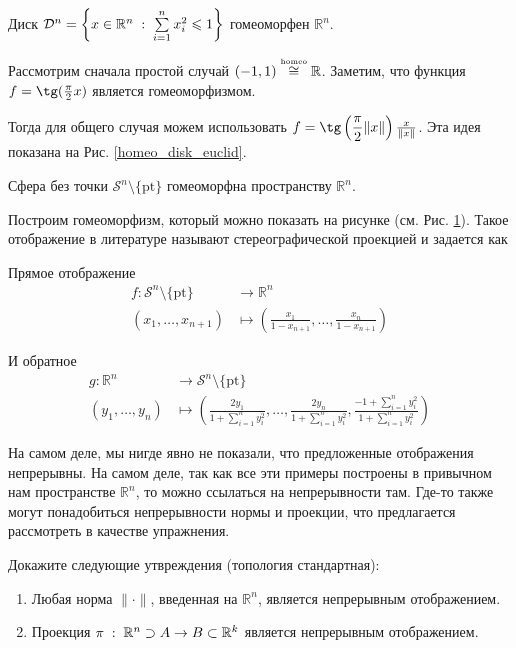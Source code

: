\begin{Ex}
    Диск $\mathcal{D}^{n} = \left\{x\in \mathbb{R}^{n} \; : \; \sum\limits_{i=1}^{n} x_i^2 \leqslant  1\right\}$ гомеоморфен $\mathbb{R}^n$.

    Рассмотрим сначала простой случай $(-1,1) \overset{\text{\tiny homeo}}{\cong} \mathbb{R}$. Заметим, что функция $f = \tg(\frac{\pi}{2}x)$ является гомеоморфизмом. 

    Тогда для общего случая можем использовать $f = \tg\left(\dfrac{\pi}{2} \|x\| \right) \frac{x}{\|x\|}$. Эта идея показана на Рис. \ref{homeo_disk_euclid}.
\end{Ex}
\begin{Ex}
    Сфера без точки $\mathcal{S}^{n} \setminus \{\mathrm{pt}\}$ гомеоморфна пространству $\mathbb{R}^{n}$.

    Построим гомеоморфизм, который можно показать на рисунке (см. Рис. \ref{homeo_sphere_euclid}). Такое отображение в литературе называют стереографической проекцией и задается как 
\begin{figure}[H]
    \centering
    \caption{}
    \label{homeo_sphere_euclid}
\end{figure}

    Прямое отображение
    \[
    \begin{split}
        f: \mathcal{S}^n\setminus \{\mathrm{pt}\} &\to \mathbb{R}^n\\
        (x_1, \dots, x_{n+1}) &\mapsto \left(\frac{x_1}{1-x_{n+1}}, \dots, \frac{x_n}{1-x_{n+1}} \right)
    \end{split}
    \] 

    И обратное
    \[
    \begin{split}
        g: \mathbb{R}^n &\to \mathcal{S}^n\setminus \{\mathrm{pt}\}\\
        (y_1, \dots, y_n) &\mapsto \left( \frac{2y_1}{1+\sum\limits_{i=1}^{n} y_i^2}, \dots, \frac{2y_n}{1+\sum\limits_{i=1}^{n} y_i^2}, \frac{-1+\sum\limits_{i=1}^{n} y_i^2}{1+\sum\limits_{i=1}^{n} y_i^2} \right)
    \end{split}
    \] 
\end{Ex}
\begin{Note}
    На самом деле, мы нигде явно не показали, что предложенные отображения непрерывны. На самом деле, так как все эти примеры построены в привычном нам пространстве $\mathbb{R}^n$, то можно ссылаться на непрерывности там. Где-то также могут понадобиться непрерывности нормы и проекции, что предлагается рассмотреть в качестве упражнения.
\end{Note}
    \begin{Task}
        Докажите следующие утвреждения (топология стандартная):
        \begin{enumerate}
            \item Любая норма $\| \cdot \|$, введенная на $\mathbb{R}^n$, является непрерывным отображением.
            \item Проекция $\pi\; : \; \mathbb{R}^n \supset A \to B \subset \mathbb{R}^k$ является непрерывным отображением.
        \end{enumerate}
    \end{Task}
